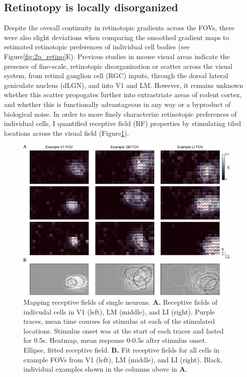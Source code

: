 \subsection{Retinotopy is locally disorganized}
Despite the overall continuity in retinotopic gradients across the FOVs, there were also slight deviations when comparing the smoothed gradient maps to estimated retinotopic preferences of individual cell bodies (see Figure\ref{fig:2p_retino}E). Previous studies in mouse visual areas indicate the presence of fine-scale, retinotopic disorganization or scatter across the visual system, from retinal ganglion cell (RGC) inputs, through the dorsal lateral geniculate nucleus (dLGN), and into V1 and LM\cite{Bonin2011, Andermann2011, Liang2018, Marques2018}. However, it remains unknown whether this scatter propogates further into extrastriate areas of rodent cortex, and whether this is functionally advantageous in any way or a byproduct of biological noise. In order to more finely characterize retinotopic preferences of individual cells, I quantified receptive field (RF) properties by stimulating tiled locations across the visual field (Figure\ref{fig:rf_examples}). 

\begin{figure}[t!]
    \includegraphics[width=\textwidth]{figures/chapter_3/fig_3-3_rf_examples/fig_3-3_rf_examples.pdf}
    \vspace{.1in}
    \caption[Receptive field mapping]{Mapping receptive fields of single neurons. \textbf{A.} Receptive fields of indivudal cells in V1 (left), LM (middle), and LI (right). Purple traces, mean time courses for stimulus at each of the stimulated locations. Stimulus onset was at the start of each traces and lasted for 0.5s. Heatmap, mean response 0-0.5s after stimulus onset. Ellipse, fitted receptive field.
    \textbf{B.} Fit receptive fields for all cells in example FOVs from V1 (left), LM (middle), and LI (right). Black, individual examples shown in the columns above in \textbf{A}.
    \label{fig:rf_examples}}
\end{figure}

